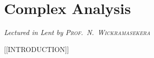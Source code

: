 \chapter[Complex Analysis \\ \textnormal{\emph{Lectured in Lent \oldstylenums{2022} by \textsc{Prof.\ N.\ Wickramasekera}}}]{Complex Analysis}
\emph{\Large Lectured in Lent  by \textsc{Prof.\ N.\ Wickramasekera}}

[[INTRODUCTION]]


